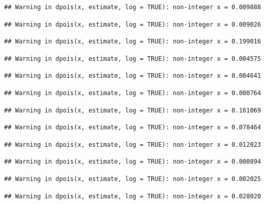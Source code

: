 \documentclass[]{article}
\begin{document}
\begin{verbatim}
## Warning in dpois(x, estimate, log = TRUE): non-integer x = 0.009888
\end{verbatim}

\begin{verbatim}
## Warning in dpois(x, estimate, log = TRUE): non-integer x = 0.009026
\end{verbatim}

\begin{verbatim}
## Warning in dpois(x, estimate, log = TRUE): non-integer x = 0.199016
\end{verbatim}

\begin{verbatim}
## Warning in dpois(x, estimate, log = TRUE): non-integer x = 0.004575
\end{verbatim}

\begin{verbatim}
## Warning in dpois(x, estimate, log = TRUE): non-integer x = 0.004641
\end{verbatim}

\begin{verbatim}
## Warning in dpois(x, estimate, log = TRUE): non-integer x = 0.000764
\end{verbatim}

\begin{verbatim}
## Warning in dpois(x, estimate, log = TRUE): non-integer x = 0.161069
\end{verbatim}

\begin{verbatim}
## Warning in dpois(x, estimate, log = TRUE): non-integer x = 0.078464
\end{verbatim}

\begin{verbatim}
## Warning in dpois(x, estimate, log = TRUE): non-integer x = 0.012023
\end{verbatim}

\begin{verbatim}
## Warning in dpois(x, estimate, log = TRUE): non-integer x = 0.000894
\end{verbatim}

\begin{verbatim}
## Warning in dpois(x, estimate, log = TRUE): non-integer x = 0.002025
\end{verbatim}

\begin{verbatim}
## Warning in dpois(x, estimate, log = TRUE): non-integer x = 0.028020
\end{verbatim}
\end{document}
